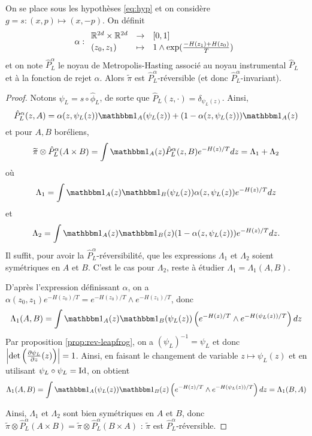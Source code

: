 \documentclass[10pt,a4paper]{article}
\begin{document}
\begin{Prop}[réversibilité]
	On se place sous les hypothèses \eqref{eq:hyp} et on considère $g = s : (x, p) \mapsto (x,-p)$. On définit
	$$
	\alpha : { \begin{array}{lcl} 
	\mathbb{R}^{2d} \times \mathbb{R}^{2d} & \to & [0,1] \\
	(z_0, z_1) & \mapsto & 1 \wedge \exp(\frac{-H(z_1)+H(z_0)}{T})
	 \end{array} }
	$$
	et on note $\hat P_L^\alpha$ le noyau de Metropolis-Hasting associé au noyau instrumental $\hat P_L$ et à la fonction de rejet $\alpha$. Alors $\widetilde \pi$ est $\hat P_L^\alpha$-réversible (et donc $\hat P_L^\alpha$-invariant). 
\end{Prop}
\begin{proof}
	Notons $\psi_L = s \circ \hat \phi_L$, de sorte que $\hat P_L(z,\cdot) = \delta_{\psi_L(z)}$. Ainsi,
	$$
	\hat P_L^\alpha(z,A) = \alpha(z,\psi_L(z)) \ind_A(\psi_L(z)) + (1-\alpha(z,\psi_L(z))) \ind_A(z)
	$$
	et pour $A,B$ boréliens,
	$$
	\widetilde \pi \otimes \hat P_L^\alpha (A \times B)
	=
	\int \ind_A(z) \hat P_L^\alpha(z,B) e^{-H(z)/T} dz
	=
	\Lambda_1 + \Lambda_2
	$$
	où
	$$
	\Lambda_1 = \int \ind_A(z) \ind_B(\psi_L(z)) \alpha(z,\psi_L(z)) e^{-H(z)/T} dz
	$$
	et
	$$
	\Lambda_2 = \int \ind_A(z) \ind_B(z) (1-\alpha(z,\psi_L(z))) e^{-H(z)/T} dz.
	$$
	Il suffit, pour avoir la $\hat P_L^\alpha$-réversibilité, que les expressions $\Lambda_1$ et $\Lambda_2$ soient symétriques en $A$ et $B$. C'est le cas pour $\Lambda_2$, reste à étudier $\Lambda_1 = \Lambda_1(A,B)$.

	D'après l'expression définissant $\alpha$, on a $\alpha(z_0,z_1) e^{-H(z_0)/T} = e^{-H(z_0)/T} \wedge e^{-H(z_1)/T}$, donc
	$$
	\Lambda_1(A,B) = \int \ind_A(z) \ind_B(\psi_L(z)) \left( e^{-H(z)/T} \wedge e^{-H(\psi_L(z))/T} \right) dz
	$$
	Par proposition \ref{prop:rev-leapfrog}, on a $(\psi_L)^{-1} = \psi_L$ et donc ${ \left| \det \left( \frac{\partial \psi_L}{\partial z}(z) \right) \right|} = 1$. Ainsi, en faisant le changement de variable $z \mapsto \psi_L(z)$ et en utilisant $\psi_L \circ \psi_L = \operatorname{Id}$, on obtient
	$$
	\Lambda_1(A,B) = \int \ind_A(\psi_L(z)) \ind_B(z) \left( e^{-H(z)/T} \wedge e^{-H(\psi_L(z))/T} \right) dz = \Lambda_1(B,A)
	$$

	Ainsi, $\Lambda_1$ et $\Lambda_2$ sont bien symétriques en $A$ et $B$, donc $\widetilde \pi \otimes \hat P_L^\alpha (A \times B) = \widetilde \pi \otimes \hat P_L^\alpha (B \times A)$ : $\widetilde \pi$ est $\hat P_L^\alpha$-réversible.
\end{proof}
\end{document}
